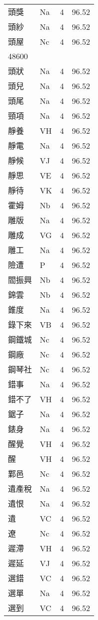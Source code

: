 \documentclass[twocolumn]{book}
\begin{document}
\begin{supertabular}{llrr}
頭獎 & Na & 4 &  96.52\\
頭紗 & Na & 4 &  96.52\\
頭屋 & Nc & 4 &  96.52\\
48600\\
頭狀 & Na & 4 &  96.52\\
頭兒 & Na & 4 &  96.52\\
頭尾 & Na & 4 &  96.52\\
頸項 & Na & 4 &  96.52\\
靜養 & VH & 4 &  96.52\\
靜電 & Na & 4 &  96.52\\
靜候 & VJ & 4 &  96.52\\
靜思 & VE & 4 &  96.52\\
靜待 & VK & 4 &  96.52\\
霍姆 & Nb & 4 &  96.52\\
雕版 & Na & 4 &  96.52\\
雕成 & VG & 4 &  96.52\\
雕工 & Na & 4 &  96.52\\
險遭 & P & 4 &  96.52\\
閻振興 & Nb & 4 &  96.52\\
錦雲 & Nb & 4 &  96.52\\
錐度 & Na & 4 &  96.52\\
錄下來 & VB & 4 &  96.52\\
鋼鐵城 & Nc & 4 &  96.52\\
鋼廠 & Nc & 4 &  96.52\\
鋼琴社 & Nc & 4 &  96.52\\
錯事 & Na & 4 &  96.52\\
錯不了 & VH & 4 &  96.52\\
鋸子 & Na & 4 &  96.52\\
錶身 & Na & 4 &  96.52\\
醒覺 & VH & 4 &  96.52\\
醒 & VH & 4 &  96.52\\
鄴邑 & Nc & 4 &  96.52\\
遺產稅 & Na & 4 &  96.52\\
遺恨 & Na & 4 &  96.52\\
遺 & VC & 4 &  96.52\\
遼 & Nc & 4 &  96.52\\
遲滯 & VH & 4 &  96.52\\
遲延 & VJ & 4 &  96.52\\
選錯 & VC & 4 &  96.52\\
選單 & Na & 4 &  96.52\\
選到 & VC & 4 &  96.52\\

\end{supertabular}
\end{document}
